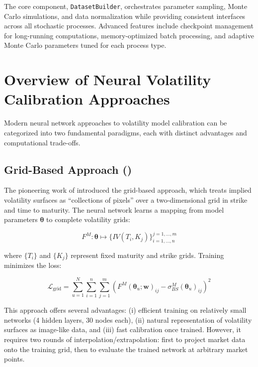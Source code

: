 	The core component, \texttt{DatasetBuilder}, orchestrates parameter sampling, Monte Carlo simulations, and data normalization while providing consistent interfaces across all stochastic processes. Advanced features include checkpoint management for long-running computations, memory-optimized batch processing, and adaptive Monte Carlo parameters tuned for each process type.
	
	\section{Overview of Neural Volatility Calibration Approaches}\label{sec:approaches}
	
	Modern neural network approaches to volatility model calibration can be categorized into two fundamental paradigms, each with distinct advantages and computational trade-offs.
	
	\subsection{Grid-Based Approach (\citet{Horvath2021DLV})}\label{subsec:grid_approach}
	
	The pioneering work of \citet{Horvath2021DLV} introduced the grid-based approach, which treats implied volatility surfaces as ``collections of pixels'' over a two-dimensional grid in strike and time to maturity. The neural network learns a mapping from model parameters $\boldsymbol{\theta}$ to complete volatility grids:
	
	\begin{equation}
		F^M: \boldsymbol{\theta} \mapsto \{IV(T_i, K_j)\}_{i=1,\ldots,n}^{j=1,\ldots,m}
	\end{equation}
	
	where $\{T_i\}$ and $\{K_j\}$ represent fixed maturity and strike grids. Training minimizes the loss:
	
	\begin{equation}
		\mathcal{L}_{\text{grid}} = \sum_{u=1}^N \sum_{i=1}^n \sum_{j=1}^m \left(F^M(\boldsymbol{\theta}_u; \mathbf{w})_{ij} - \sigma^M_{BS}(\boldsymbol{\theta}_u)_{ij}\right)^2
	\end{equation}
	
	This approach offers several advantages: (i) efficient training on relatively small networks (4 hidden layers, 30 nodes each), (ii) natural representation of volatility surfaces as image-like data, and (iii) fast calibration once trained. However, it requires two rounds of interpolation/extrapolation: first to project market data onto the training grid, then to evaluate the trained network at arbitrary market points.
	
